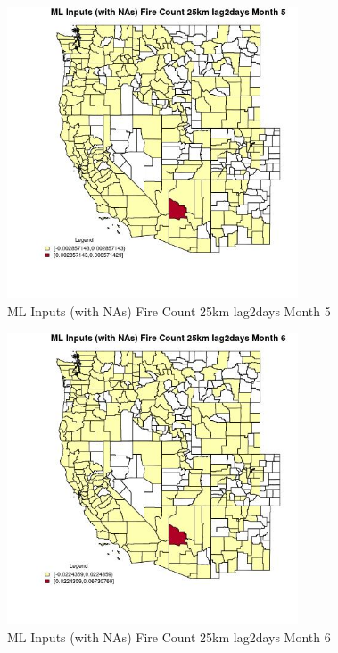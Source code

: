 \clearpage 

\begin{figure} 
\centering  
\includegraphics[width=0.77\textwidth]{Code_Outputs/Report_ML_input_PM25_Step4_part_e_de_duplicated_aves_compiled_2019-05-20wNAs_CountyFire_Count_25km_lag2daysmedianMonth5.jpg} 
\caption{\label{fig:Report_ML_input_PM25_Step4_part_e_de_duplicated_aves_compiled_2019-05-20wNAsCountyFire_Count_25km_lag2daysmedianMonth5}ML Inputs (with NAs) Fire Count 25km lag2days Month 5} 
\end{figure} 
 

\begin{figure} 
\centering  
\includegraphics[width=0.77\textwidth]{Code_Outputs/Report_ML_input_PM25_Step4_part_e_de_duplicated_aves_compiled_2019-05-20wNAs_CountyFire_Count_25km_lag2daysmedianMonth6.jpg} 
\caption{\label{fig:Report_ML_input_PM25_Step4_part_e_de_duplicated_aves_compiled_2019-05-20wNAsCountyFire_Count_25km_lag2daysmedianMonth6}ML Inputs (with NAs) Fire Count 25km lag2days Month 6} 
\end{figure} 
 

